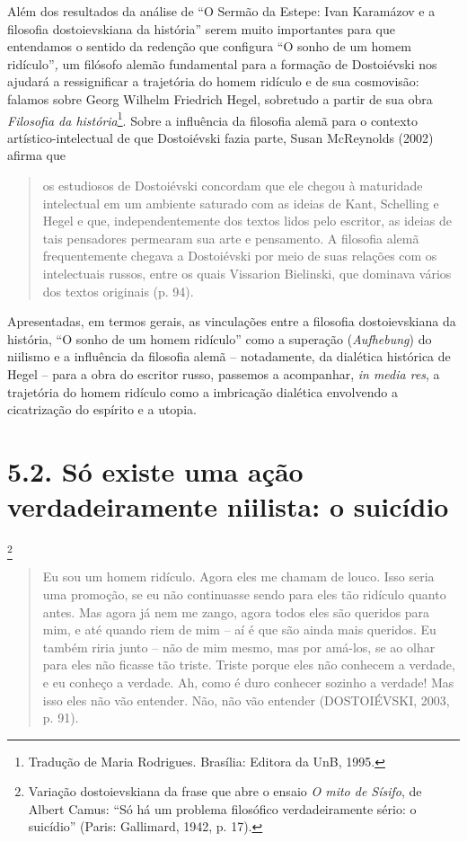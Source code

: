 Além dos resultados da análise de ``O Sermão da Estepe: Ivan Karamázov e
a filosofia dostoievskiana da história'' serem muito importantes para
que entendamos o sentido da redenção que configura ``O sonho de um homem
ridículo''\emph{,} um filósofo alemão fundamental para a formação de
Dostoiévski nos ajudará a ressignificar a trajetória do homem ridículo e
de sua cosmovisão: falamos sobre Georg Wilhelm Friedrich Hegel,
sobretudo a partir de sua obra \emph{Filosofia da história}\footnote{Tradução
  de Maria Rodrigues. Brasília: Editora da UnB, 1995.}. Sobre a
influência da filosofia alemã para o contexto artístico-intelectual de
que Dostoiévski fazia parte, Susan McReynolds (2002) afirma que

\begin{quote}
os estudiosos de Dostoiévski concordam que ele chegou à maturidade
intelectual em um ambiente saturado com as ideias de Kant, Schelling e
Hegel e que, independentemente dos textos lidos pelo escritor, as ideias
de tais pensadores permearam sua arte e pensamento. A filosofia alemã
frequentemente chegava a Dostoiévski por meio de suas relações com os
intelectuais russos, entre os quais Vissarion Bielinski, que dominava
vários dos textos originais (p. 94).
\end{quote}

Apresentadas, em termos gerais, as vinculações entre a filosofia
dostoievskiana da história, ``O sonho de um homem ridículo'' como a
superação (\emph{Aufhebung}) do niilismo e a influência da filosofia
alemã -- notadamente, da dialética histórica de Hegel -- para a obra do
escritor russo, passemos a acompanhar, \emph{in media res}, a trajetória
do homem ridículo como a imbricação dialética envolvendo a cicatrização
do espírito e a utopia.

\section{5.2. Só existe uma ação verdadeiramente niilista: o
suicídio}\footnote{Variação dostoievskiana da frase que abre o ensaio
  \emph{O mito de Sísifo}, de Albert Camus: ``Só há um problema
  filosófico verdadeiramente sério: o suicídio'' (Paris: Gallimard,
  1942, p. 17).}

\begin{quote}
Eu sou um homem ridículo. Agora eles me chamam de louco. Isso seria uma
promoção, se eu não continuasse sendo para eles tão ridículo quanto
antes. Mas agora já nem me zango, agora todos eles são queridos para
mim, e até quando riem de mim -- aí é que são ainda mais queridos. Eu
também riria junto -- não de mim mesmo, mas por amá-los, se ao olhar
para eles não ficasse tão triste. Triste porque eles não conhecem a
verdade, e eu conheço a verdade. Ah, como é duro conhecer sozinho a
verdade! Mas isso eles não vão entender. Não, não vão entender
(DOSTOIÉVSKI, 2003, p. 91).
\end{quote}

